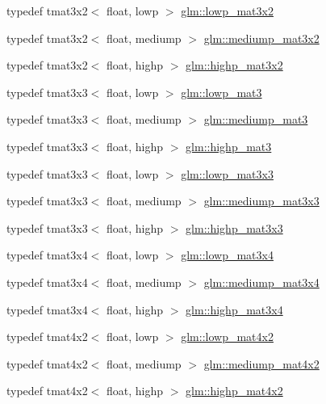 \begin{DoxyCompactItemize}
typedef tmat3x2$<$ float, lowp $>$ \hyperlink{group__core__precision_ga8db0631a52908b3b4805b6abeda26176}{glm\-::lowp\-\_\-mat3x2}
\item 
typedef tmat3x2$<$ float, mediump $>$ \hyperlink{group__core__precision_ga2237b9bb71ea5b0d2ae07f9315ccdc28}{glm\-::mediump\-\_\-mat3x2}
\item 
typedef tmat3x2$<$ float, highp $>$ \hyperlink{group__core__precision_ga5df0f5c4120d0fd47825506c86b7814c}{glm\-::highp\-\_\-mat3x2}
\item 
typedef tmat3x3$<$ float, lowp $>$ \hyperlink{group__core__precision_ga35fabe40e121bf764419b1d355cbbcd2}{glm\-::lowp\-\_\-mat3}
\item 
typedef tmat3x3$<$ float, mediump $>$ \hyperlink{group__core__precision_ga59f8b29bbf809530ab4c0ee97d03a4f9}{glm\-::mediump\-\_\-mat3}
\item 
typedef tmat3x3$<$ float, highp $>$ \hyperlink{group__core__precision_ga5822a3dc6f6d421ee0b6a3c7f41a3ff1}{glm\-::highp\-\_\-mat3}
\item 
typedef tmat3x3$<$ float, lowp $>$ \hyperlink{group__core__precision_ga8d591be4ef2bf3bbcd7473c3eadeaf55}{glm\-::lowp\-\_\-mat3x3}
\item 
typedef tmat3x3$<$ float, mediump $>$ \hyperlink{group__core__precision_gae75115c4c4608fccf6827f7a25d95885}{glm\-::mediump\-\_\-mat3x3}
\item 
typedef tmat3x3$<$ float, highp $>$ \hyperlink{group__core__precision_gac4db2c4ff089b960ddd5682abaa9e5d4}{glm\-::highp\-\_\-mat3x3}
\item 
typedef tmat3x4$<$ float, lowp $>$ \hyperlink{group__core__precision_ga06b2903b2f784e0e74e58f25e9b79b15}{glm\-::lowp\-\_\-mat3x4}
\item 
typedef tmat3x4$<$ float, mediump $>$ \hyperlink{group__core__precision_ga0ea90a4a20efa6c104c7ad21144ccefe}{glm\-::mediump\-\_\-mat3x4}
\item 
typedef tmat3x4$<$ float, highp $>$ \hyperlink{group__core__precision_gab51b3b8377cf9462a39a1560333a4215}{glm\-::highp\-\_\-mat3x4}
\item 
typedef tmat4x2$<$ float, lowp $>$ \hyperlink{group__core__precision_gaae545974fa5b7fcb9574ea67f8922c50}{glm\-::lowp\-\_\-mat4x2}
\item 
typedef tmat4x2$<$ float, mediump $>$ \hyperlink{group__core__precision_gaa8a2840660d106dca70acf525e8bfa6c}{glm\-::mediump\-\_\-mat4x2}
\item 
typedef tmat4x2$<$ float, highp $>$ \hyperlink{group__core__precision_ga289d5d6b112dc6e3f545e7f98d3d0b5c}{glm\-::highp\-\_\-mat4x2}

\end{DoxyCompactItemize}
